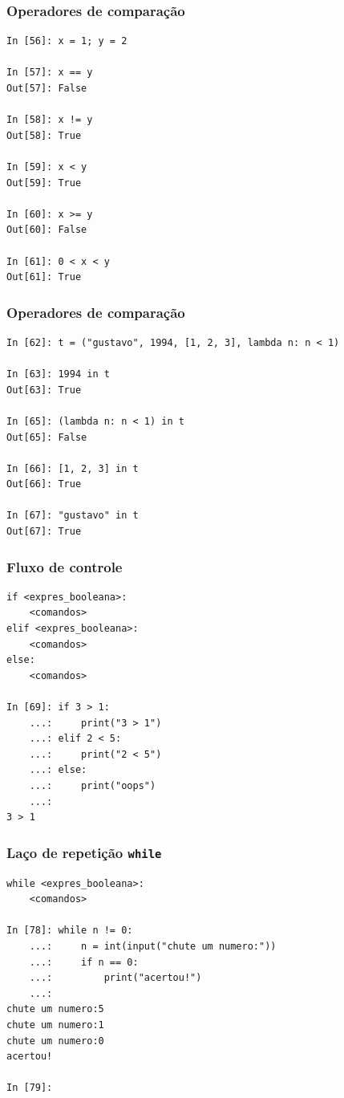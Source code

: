 \documentclass[aspectratio=169]{beamer}
\begin{document}
\begin{frame}[fragile]
	\frametitle{Operadores de comparação}
	\begin{lstlisting}
In [56]: x = 1; y = 2

In [57]: x == y
Out[57]: False

In [58]: x != y
Out[58]: True

In [59]: x < y
Out[59]: True

In [60]: x >= y
Out[60]: False

In [61]: 0 < x < y
Out[61]: True
	\end{lstlisting}
\end{frame}


\begin{frame}[fragile]
	\frametitle{Operadores de comparação}
	\begin{lstlisting}
In [62]: t = ("gustavo", 1994, [1, 2, 3], lambda n: n < 1)

In [63]: 1994 in t
Out[63]: True

In [65]: (lambda n: n < 1) in t
Out[65]: False

In [66]: [1, 2, 3] in t
Out[66]: True

In [67]: "gustavo" in t
Out[67]: True
	\end{lstlisting}
\end{frame}


\begin{frame}[fragile]
	\frametitle{Fluxo de controle}
	\begin{lstlisting}
if <expres_booleana>:
	<comandos>
elif <expres_booleana>:
	<comandos>
else:
	<comandos>

In [69]: if 3 > 1:
    ...:     print("3 > 1")
    ...: elif 2 < 5:
    ...:	 print("2 < 5")
    ...: else:
    ...:     print("oops")
    ...:
3 > 1
	\end{lstlisting}
\end{frame}

\begin{frame}[fragile]
	\frametitle{Laço de repetição \texttt{while}}
	\begin{lstlisting}
while <expres_booleana>:
	<comandos>

In [78]: while n != 0:
    ...:     n = int(input("chute um numero:"))
    ...:     if n == 0:
    ...:         print("acertou!")
    ...:
chute um numero:5
chute um numero:1
chute um numero:0
acertou!

In [79]:
	\end{lstlisting}
\end{frame}
\end{document}
